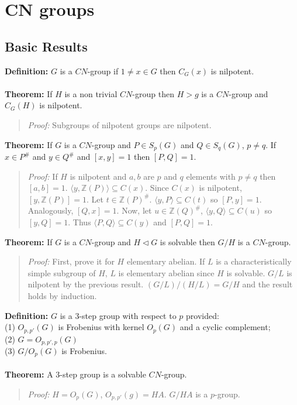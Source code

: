 \chapter{CN groups}
\section {Basic Results}
{\bf Definition:} $G$ is a $CN$-group if $1 \ne x \in G$ then $C_G(x)$ is nilpotent.
\\
\\
{\bf Theorem:} If $H$ is a non trivial $CN$-group then $H>g$ is a $CN$-group and $C_G(H)$ is nilpotent.
\begin{quote}
\emph{Proof:} Subgroups of nilpotent groups are nilpotent.
\end{quote}
{\bf Theorem:}
If $G$ is a $CN$-group and
$P \in S_p(G)$ and
$Q \in S_q(G)$, $p \ne q$.  If $x \in P^{\#}$ and $y \in Q^{\#}$ and $[x,y]=1$ then $[P,Q]=1$.
\begin{quote}
\emph{Proof:}  If $H$ is nilpotent and $a, b$ are $p$ and $q$ elements with $p \neq q$ then $[a,b] =1$.
$\langle y, {\mathbb Z}(P) \rangle \subseteq C(x)$.  Since $C(x)$ is nilpotent, $[y, {\mathbb Z}(P)] =1$.
Let $t \in {\mathbb Z}(P)^{\#}$. $\langle y, P \rangle \subseteq C(t)$ so $[P,y]=1$.  Analogously,
$[Q,x]=1$.  Now, let $u \in {\mathbb Z}(Q)^{\#}$, $\langle y, Q \rangle \subseteq C(u)$ so $[y, Q] = 1$.
Thus $\langle P, Q \rangle \subseteq C(y)$ and $[P, Q]=1$.
\end{quote}
{\bf Theorem:} If $G$ is a $CN$-group and $H \lhd G$ is solvable then $G/H$ is a $CN$-group.
\begin{quote}
\emph{Proof:} First, prove it for $H$ elementary abelian.  If $L$ is a characteristically simple subgroup
of $H$, $L$ is elementary abelian since $H$ is solvable.  $G/L$ is nilpotent by the previous result.
$(G/L)/(H/L) = G/H$ and the result holds by induction.
\end{quote}
{\bf Definition:} $G$ is a $3$-step group with respect to $p$ provided:\\
(1) $O_{p, p'}(G)$ is Frobenius with kernel $O_p(G)$ and a cyclic complement;\\
(2) $G= O_{p,p',p}(G)$ \\
(3) $G/O_p(G)$ is Frobenius.
\\
\\
{\bf Theorem:}  A $3$-step group is a solvable $CN$-group.
\begin{quote}
\emph{Proof:}
$H=O_p(G)$, $O_{p,p'}(g)=HA$.  $G/HA$ is a $p$-group.
\end{quote}
